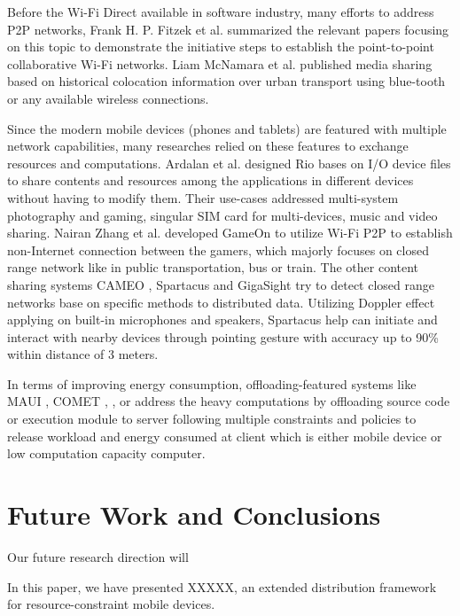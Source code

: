 \documentclass[conference]{IEEEtran}
\begin{document}
Before the Wi-Fi Direct available in software industry, many efforts to address P2P networks, Frank H. P. Fitzek et al. \cite{m_p2p_tutor} summarized the relevant papers focusing on this topic to demonstrate the initiative steps to establish the point-to-point collaborative Wi-Fi networks. Liam McNamara et al. published \cite{media_share} media sharing based on historical colocation information over urban transport using blue-tooth or any available wireless connections.

Since the modern mobile devices (phones and tablets) are featured with multiple network capabilities, many researches relied on these features to exchange resources and computations. Ardalan et al. designed Rio \cite{rio} bases on I/O device files to share contents and resources among the applications in different devices without having to modify them. Their use-cases addressed multi-system photography and gaming, singular SIM card for multi-devices, music and video sharing. Nairan Zhang et al. developed GameOn \cite{gameon} to utilize Wi-Fi P2P to establish non-Internet connection between the gamers, which majorly focuses on closed range network like in public transportation, bus or train. The other content sharing systems CAMEO \cite{cameo}, Spartacus \cite{spartacus} and GigaSight \cite{crowd-sourcing} try to detect closed range networks base on specific methods to distributed data. Utilizing Doppler effect applying on built-in microphones and speakers, Spartacus help can initiate and interact with nearby devices through pointing gesture with accuracy up to 90\% within distance of 3 meters.

In terms of improving energy consumption, offloading-featured systems like MAUI \cite{maui}, COMET \cite{comet}, \cite{cloud-offload}, \cite{mobile-cloud-middleware} or \cite{fuzzy-engine} address the heavy computations by offloading source code or execution module to server following multiple constraints and policies to release workload and energy consumed at client which is either mobile device or low computation capacity computer. 

\section{Future Work and Conclusions}
\label{sec:conc}
Our future research direction will 

In this paper, we have presented XXXXX, an extended distribution framework for resource-constraint mobile devices. 


\balance


\end{document}
